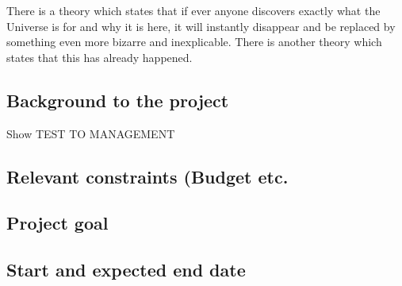 There is a theory which states that if ever anyone discovers exactly what the Universe is for and why it is here, it will instantly disappear and be replaced by something even more bizarre and inexplicable.
There is another theory which states that this has already happened.

\subsection{Background to the project}
Show TEST TO MANAGEMENT
\subsection{Relevant constraints (Budget etc.}

\subsection{Project goal}

\subsection{Start and expected end date}